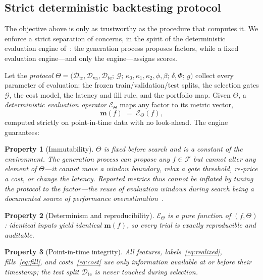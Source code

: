 \documentclass[11pt]{article}
\newtheorem{property}{Property}
\newcommand{\Fspace}{\mathcal{F}}
\newcommand{\gates}{\mathcal{G}}
\newcommand{\proto}{\Theta}
\newcommand{\evalop}{\mathcal{E}}
\begin{document}
\subsection{Strict deterministic backtesting protocol}
\label{sub:protocol}

The objective above is only as trustworthy as the procedure that computes it. We
enforce a strict separation of concerns, in the spirit of the deterministic evaluation
engine of~\cite{huang2026hypotheses}: the generation process proposes factors, while a
fixed evaluation engine---and only the engine---assigns scores.

Let the \emph{protocol}
$\proto=\big(\mathcal{D}_{\mathrm{tr}},\mathcal{D}_{\mathrm{va}},\mathcal{D}_{\mathrm{te}};\,
\gates;\,\kappa_0,\kappa_1,\kappa_2,\phi,\beta;\,\delta,\Phi;\,g\big)$
collect every parameter of evaluation: the frozen train/validation/test splits, the
selection gates $\gates$, the cost model, the latency and fill rule, and the portfolio
map. Given $\proto$, a \emph{deterministic evaluation operator} $\evalop_\proto$ maps any
factor to its metric vector,
\begin{equation}
  \bm{m}(f) \;=\; \evalop_\proto(f),
  \label{eq:evalop}
\end{equation}
computed strictly on point-in-time data with no look-ahead. The engine guarantees:

\begin{property}[Immutability]
\label{prop:immut}
$\proto$ is fixed before search and is a constant of the environment. The
generation process can propose any $f\in\Fspace$ but cannot alter any element of
$\proto$---it cannot move a window boundary, relax a gate threshold, re-price a cost, or
change the latency. Reported metrics thus cannot be inflated by tuning the protocol to
the factor---the reuse of evaluation windows during search being a documented source of
performance overestimation~\cite{deng2025autoquant}.
\end{property}

\begin{property}[Determinism and reproducibility]
\label{prop:det}
$\evalop_\proto$ is a pure function of $(f,\proto)$: identical inputs yield identical
$\bm{m}(f)$, so every trial is exactly reproducible and auditable.
\end{property}

\begin{property}[Point-in-time integrity]
\label{prop:pit}
All features, labels~\eqref{eq:realized}, fills~\eqref{eq:fill}, and
costs~\eqref{eq:cost} use only information available at or before their timestamp;
the test split $\mathcal{D}_{\mathrm{te}}$ is never touched during selection.
\end{property}
\end{document}
